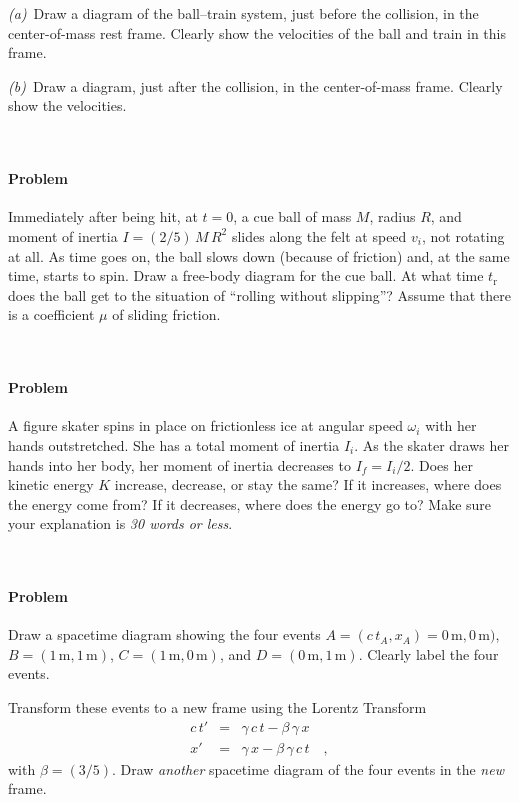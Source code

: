 \documentclass[12pt]{article}
\newcommand{\m}{\mathrm{m}}
\newcounter{problem}
\begin{document}
\textsl{(a)}~Draw a diagram of the ball--train system, just before the
collision, in the center-of-mass rest frame.  Clearly show the
velocities of the ball and train in this frame.

\textsl{(b)}~Draw a diagram, just after the collision, in the
center-of-mass frame.  Clearly show the velocities.

~ \vfill ~

\paragraph{Problem~\theproblem}%
Immediately after being hit, at $t=0$, a cue ball of mass $M$, radius
$R$, and moment of inertia $I=(2/5)\,M\,R^2$ slides along the felt at
speed $v_i$, not rotating at all.  As time goes on, the ball slows
down (because of friction) and, at the same time, starts to spin.
Draw a free-body diagram for the cue ball.  At what time
$t_\mathrm{r}$ does the ball get to the situation of ``rolling without
slipping''?  Assume that there is a coefficient $\mu$ of sliding
friction.

~ \vfill ~

\clearpage

\paragraph{Problem~\theproblem}%
A figure skater spins in place on frictionless ice at angular speed
$\omega_i$ with her hands outstretched.  She has a total moment of
inertia $I_i$.  As the skater draws her hands into her body, her
moment of inertia decreases to $I_f=I_i/2$.  Does her kinetic energy
$K$ increase, decrease, or stay the same?  If it increases, where does
the energy come from?  If it decreases, where does the energy go to?
Make sure your explanation is \emph{30 words or less}.

~ \vfill ~

\paragraph{Problem~\theproblem}%
Draw a spacetime diagram showing the four events
$A=(c\,t_A,x_A)=0\,\m,0\,\m)$, $B=(1\,\m,1\,\m)$, $C=(1\,\m,0\,\m)$,
and $D=(0\,\m,1\,\m)$.  Clearly label the four events.

Transform these events to a new frame using the Lorentz
Transform
\begin{eqnarray}\displaystyle
c\,t' & = & \gamma\,c\,t - \beta\,\gamma\,   x \nonumber\\
   x' & = & \gamma\,   x - \beta\,\gamma\,c\,t \quad ,
\end{eqnarray}
with $\beta=(3/5)$.  Draw \emph{another} spacetime diagram of the
four events in the \emph{new} frame.
\end{document}
